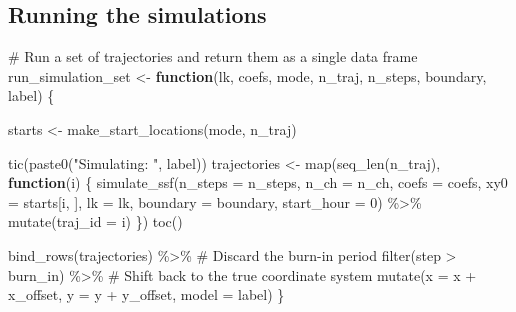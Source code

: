 \documentclass[
  letterpaper,
  DIV=11,
  numbers=noendperiod]{scrartcl}
\newenvironment{Shaded}{\begin{snugshade}}{\end{snugshade}}
\newcommand{\AttributeTok}[1]{\textcolor[rgb]{0.40,0.45,0.13}{#1}}
\newcommand{\CommentTok}[1]{\textcolor[rgb]{0.37,0.37,0.37}{#1}}
\newcommand{\ControlFlowTok}[1]{\textcolor[rgb]{0.00,0.23,0.31}{\textbf{#1}}}
\newcommand{\DecValTok}[1]{\textcolor[rgb]{0.68,0.00,0.00}{#1}}
\newcommand{\FunctionTok}[1]{\textcolor[rgb]{0.28,0.35,0.67}{#1}}
\newcommand{\NormalTok}[1]{\textcolor[rgb]{0.00,0.23,0.31}{#1}}
\newcommand{\OtherTok}[1]{\textcolor[rgb]{0.00,0.23,0.31}{#1}}
\newcommand{\SpecialCharTok}[1]{\textcolor[rgb]{0.37,0.37,0.37}{#1}}
\newcommand{\StringTok}[1]{\textcolor[rgb]{0.13,0.47,0.30}{#1}}
\begin{document}
\subsection{Running the simulations}\label{running-the-simulations}

\begin{Shaded}
\begin{Highlighting}[]
\CommentTok{\#\textquotesingle{} Run a set of trajectories and return them as a single data frame}
\NormalTok{run\_simulation\_set }\OtherTok{\textless{}{-}} \ControlFlowTok{function}\NormalTok{(lk, coefs, mode, n\_traj, n\_steps, boundary, label) \{}

\NormalTok{  starts }\OtherTok{\textless{}{-}} \FunctionTok{make\_start\_locations}\NormalTok{(mode, n\_traj)}

  \FunctionTok{tic}\NormalTok{(}\FunctionTok{paste0}\NormalTok{(}\StringTok{"Simulating: "}\NormalTok{, label))}
\NormalTok{  trajectories }\OtherTok{\textless{}{-}} \FunctionTok{map}\NormalTok{(}\FunctionTok{seq\_len}\NormalTok{(n\_traj), }\ControlFlowTok{function}\NormalTok{(i) \{}
    \FunctionTok{simulate\_ssf}\NormalTok{(}\AttributeTok{n\_steps  =}\NormalTok{ n\_steps,}
                 \AttributeTok{n\_ch     =}\NormalTok{ n\_ch,}
                 \AttributeTok{coefs    =}\NormalTok{ coefs,}
                 \AttributeTok{xy0      =}\NormalTok{ starts[i, ],}
                 \AttributeTok{lk       =}\NormalTok{ lk,}
                 \AttributeTok{boundary =}\NormalTok{ boundary,}
                 \AttributeTok{start\_hour =} \DecValTok{0}\NormalTok{) }\SpecialCharTok{\%\textgreater{}\%}
      \FunctionTok{mutate}\NormalTok{(}\AttributeTok{traj\_id =}\NormalTok{ i)}
\NormalTok{  \})}
  \FunctionTok{toc}\NormalTok{()}

  \FunctionTok{bind\_rows}\NormalTok{(trajectories) }\SpecialCharTok{\%\textgreater{}\%}
    \CommentTok{\# Discard the burn{-}in period}
    \FunctionTok{filter}\NormalTok{(step }\SpecialCharTok{\textgreater{}}\NormalTok{ burn\_in) }\SpecialCharTok{\%\textgreater{}\%}
    \CommentTok{\# Shift back to the true coordinate system}
    \FunctionTok{mutate}\NormalTok{(}\AttributeTok{x =}\NormalTok{ x }\SpecialCharTok{+}\NormalTok{ x\_offset,}
           \AttributeTok{y =}\NormalTok{ y }\SpecialCharTok{+}\NormalTok{ y\_offset,}
           \AttributeTok{model =}\NormalTok{ label)}
\NormalTok{\}}
\end{Highlighting}
\end{Shaded}
\end{document}

